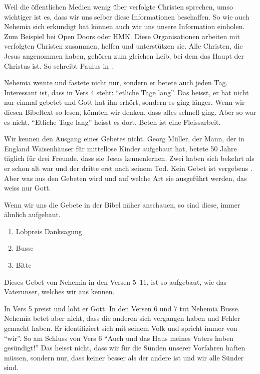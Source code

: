 \documentclass[fontsize=16pt]{mybib}
\begin{document}
Weil die öffentlichen Medien wenig über verfolgte Christen sprechen, umso wichtiger ist es, dass wir uns selber diese Informationen beschaffen. So wie auch Nehemia sich erkundigt hat können auch wir uns unsere Information einholen. Zum Beispiel bei Open Doors oder HMK. Diese Organisationen arbeiten mit verfolgten Christen zusammen, helfen und unterstützen sie. Alle Christen, die Jesus angenommen haben, gehören zum gleichen Leib, bei dem das Haupt der Christus ist. So schreibt Paulus in .


Nehemia weinte und fastete nicht nur, sondern er betete auch jeden Tag. Interessant ist, dass in Vers 4 steht: \enquote{etliche Tage lang}. Das heisst, er hat nicht nur einmal gebetet und Gott hat ihn erhört, sondern es ging länger. Wenn wir diesen Bibeltext so lesen, könnten wir denken, dass alles schnell ging. Aber so war es nicht. \enquote{Etliche Tage lang} heisst es dort. Beten ist eine Fleissarbeit.

Wir kennen den Ausgang eines Gebetes nicht. Georg Müller, der Mann, der in England Waisenhäuser für mittellose Kinder aufgebaut hat, betete 50 Jahre täglich für drei Freunde, dass sie Jesus kennenlernen. Zwei haben sich bekehrt als er schon alt war und der dritte erst nach seinem Tod. Kein Gebet ist vergebens . Aber was aus den Gebeten wird und auf welche Art sie ausgeführt werden, das weiss nur Gott.

Wenn wir uns die Gebete in der Bibel näher anschauen, so sind diese, immer ähnlich aufgebaut.
\begin{enumerate}
    \item Lobpreis Danksagung
    \item Busse
    \item Bitte
\end{enumerate}
Dieses Gebet von Nehemia in den Versen 5--11, ist so aufgebaut, wie das Vaterunser, welches wir aus  kennen.


In Vers 5 preist und lobt er Gott. In den Versen 6 und 7 tut Nehemia Busse. Nehemia betet aber nicht, dass die anderen sich vergangen haben und Fehler gemacht haben. Er identifiziert sich mit seinem Volk und spricht immer von \enquote{wir}. So am Schluss von Vers 6 \enquote{Auch  und das Haus meines Vaters haben gesündigt!} Das heisst nicht, dass wir für die Sünden unserer Vorfahren haften müssen, sondern nur, dass keiner besser als der andere ist und wir alle Sünder sind.
\end{document}
